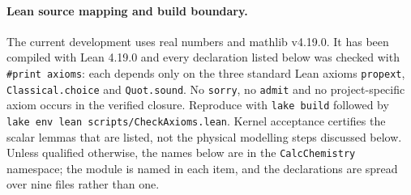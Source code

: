 \documentclass[11pt,a4paper]{article}
\theoremstyle{plain}
\theoremstyle{definition}
\theoremstyle{remark}
\begin{document}
\paragraph{Lean source mapping and build boundary.}
The current development uses real numbers and mathlib v4.19.0. It has been
compiled with Lean 4.19.0 and every declaration listed below was checked with
\texttt{\#print axioms}: each depends only on the three standard Lean axioms
\texttt{propext}, \texttt{Classical.choice} and \texttt{Quot.sound}. No
\texttt{sorry}, no \texttt{admit} and no project-specific axiom occurs in the
verified closure. Reproduce with \texttt{lake build} followed by
\texttt{lake env lean scripts/CheckAxioms.lean}. Kernel acceptance certifies the
scalar lemmas that are listed, not the physical modelling steps discussed
below. Unless qualified otherwise, the names below are in the
\texttt{CalcChemistry} namespace; the module is named in each item, and the
declarations are spread over nine files rather than one.
\end{document}

